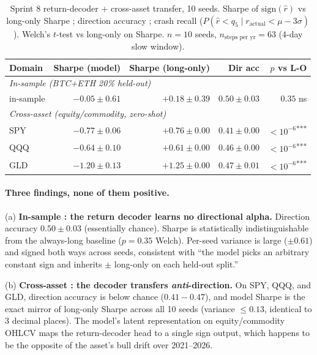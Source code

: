 \documentclass[11pt,a4paper]{article}
\begin{document}
\begin{table}[h]
\centering
\caption{Sprint 8 return-decoder + cross-asset transfer,
10 seeds. Sharpe of $\mathrm{sign}(\hat{r})$ vs long-only Sharpe ;
direction accuracy ; crash recall ($P(\hat{r} {<} q_5 \mid
r_{\text{actual}} {<} \mu {-} 3\sigma)$). Welch's $t$-test
vs long-only on Sharpe. $n{=}10$ seeds, $n_{\text{steps per yr}}
{=}63$ (4-day slow window).}
\label{tab:sprint8}
\begin{tabular}{lrrrr}
\toprule
Domain & Sharpe (model) & Sharpe (long-only) & Dir acc & $p$ vs L-O \\
\midrule
\multicolumn{5}{l}{\textit{In-sample (BTC+ETH 20\% held-out)}} \\
in-sample      & $-0.05 \pm 0.61$ & $+0.18 \pm 0.39$ & $0.50 \pm 0.03$ & $0.35$ ns \\
\midrule
\multicolumn{5}{l}{\textit{Cross-asset (equity/commodity, zero-shot)}} \\
SPY            & $-0.77 \pm 0.06$ & $+0.76 \pm 0.00$ & $0.41 \pm 0.00$ & $<10^{-6}$\textsuperscript{***} \\
QQQ            & $-0.64 \pm 0.10$ & $+0.61 \pm 0.00$ & $0.46 \pm 0.00$ & $<10^{-6}$\textsuperscript{***} \\
GLD            & $-1.20 \pm 0.13$ & $+1.25 \pm 0.00$ & $0.47 \pm 0.01$ & $<10^{-6}$\textsuperscript{***} \\
\bottomrule
\end{tabular}
\end{table}

\paragraph{Three findings, none of them positive.}

(a) \textbf{In-sample : the return decoder learns no directional
alpha.} Direction accuracy $0.50 \pm 0.03$ (essentially chance).
Sharpe is statistically indistinguishable from the always-long
baseline ($p {=} 0.35$ Welch). Per-seed variance is large
($\pm 0.61$) and signed both ways across seeds, consistent with
``the model picks an arbitrary constant sign and inherits
$\pm$ long-only on each held-out split.''

(b) \textbf{Cross-asset : the decoder transfers \emph{anti}-direction.}
On SPY, QQQ, and GLD, direction accuracy is below chance
($0.41{-}0.47$), and model Sharpe is the exact mirror of
long-only Sharpe across all 10 seeds (variance $\le 0.13$,
identical to 3 decimal places). The model's latent representation
on equity/commodity OHLCV maps the return-decoder head to a
single sign output, which happens to be the opposite of the
asset's bull drift over 2021--2026.
\end{document}
